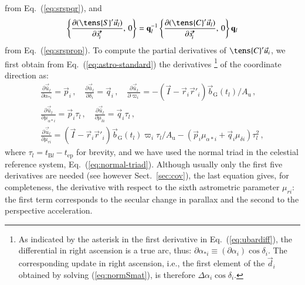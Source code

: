 \documentclass[structabstract]{aa}
\newcommand{\quat}[1]{\mathbf{#1}}
\begin{document}
from Eq.~(\ref{eq:srspqr}), and 
\begin{equation}\label{eq:srspropdiff}
\left\{\frac{\partial(\tens{S}'\vec{u}_l)}{\partial\vec{s}'_{\!i}},\,0\right\}=
\quat{q}_l^{-1}\left\{\frac{\partial(\tens{C}'\vec{u}_l)}{\partial\vec{s}'_{\!i}},\,0\right\}\quat{q}_l
\end{equation}
from Eq.~(\ref{eq:srsprop}).
To compute the partial derivatives of $\tens{C}'\vec{u}_i$, we first obtain 
from Eq.~(\ref{eq:astro-standard}) the derivatives%
\footnote{As indicated by the asterisk in the first derivative in 
Eq.~(\ref{eq:ubardiff}), the differential in right ascension is a true arc, 
thus: $\partial\alpha_{*i}\equiv (\partial\alpha_i)\cos\delta_i$.
The corresponding update in right ascension, i.e., the first element of 
the $\vec{d}_i$ obtained by solving (\ref{eq:normSmat}), is therefore
$\Delta\alpha_i\cos\delta_i$.\label{footn:ast}}
of the coordinate direction as:
\begin{multline}\label{eq:ubardiff}
\frac{\partial\vec{\bar{u}}_l}{\partial\alpha_{*i}} = \vec{p}_i \, , \quad
\frac{\partial\vec{\bar{u}}_l}{\partial\delta_{i}} = \vec{q}_i \, , \quad
\frac{\partial\vec{\bar{u}}_l}{\partial\varpi_{i}} =
-(\vec{I}-\vec{r}_i\vec{r}'_i)\vec{b}_\text{G}(t_l)/A_\text{u} \, , \\
\frac{\partial\vec{\bar{u}}_l}{\partial\mu_{\alpha *i}} = 
\vec{p}_i\tau_l \, , \quad
\frac{\partial\vec{\bar{u}}_l}{\partial\mu_{\delta i}} = 
\vec{q}_i\tau_l \, , \\
\frac{\partial\vec{\bar{u}}_l}{\partial\mu_{r i}} = 
(\vec{I}-\vec{r}_i\vec{r}'_i)\vec{b}_\text{G}(t_l)\varpi_i\tau_l/A_\text{u}
- (\vec{p}_i\mu_{\alpha *i}+\vec{q}_i\mu_{\delta i})\tau_l^2 \, ,
\end{multline}
where $\tau_l=t_{\text{B}l}-t_\text{ep}$ for brevity, and we have used 
the normal triad in the celestial reference system, Eq.~(\ref{eq:normal-triad}).
Although usually only the first five derivatives are needed (see however Sect.~\ref{sec:cov}), 
the last equation gives, for completeness, the derivative with respect to the sixth 
astrometric parameter $\mu_{ri}$: the first term corresponds to the secular 
change in parallax and the second to the perspective acceleration.
 
\end{document}
